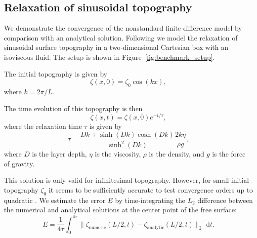 \documentclass[preprint,12pt,authoryear]{elsarticle}
\begin{document}
\subsection{Relaxation of sinusoidal topography}
\label{sec:topography_relaxation}

We demonstrate the convergence of the nonstandard finite difference model by comparison 
with an analytical solution. Following \citet{kramer2012implicit} we model the relaxation
of sinusoidal surface topography in a two-dimensional Cartesian box with an isoviscous fluid.
The setup is shown in Figure~\ref{fig:benchmark_setup}.

The initial topography is given by
\begin{equation}
\zeta(x,0) = \zeta_0 \cos\left( k x \right),
\end{equation}
where $k = 2 \pi / L$.

The time evolution of this topography is then
\begin{equation}
\zeta(x, t) = \zeta(x,0) e^{-t/\tau},
\end{equation}
where the relaxation time $\tau$ is given by
\begin{equation}
\tau = \frac{D k + \sinh(D k) \cosh(D k)}{ \sinh^2 (D k) } \frac{2 k \eta}{\rho g},
\end{equation}
where $D$ is the layer depth, $\eta$ is the viscosity, $\rho$ is the density, and $g$ is the force of gravity.

This solution is only valid for infinitesimal topography. However, for small
initial topography $\zeta_0$ it seems to be sufficiently accurate to test convergence orders up 
to quadratic \citep{kramer2012implicit, furuichi2015implicit}.
We estimate the error $E$ by time-integrating the $L_2$ difference between the numerical and analytical
solutions at the center point of the free surface:
\begin{equation}
E = \frac{1}{4\tau}\int_0^{4 \tau} \lVert \zeta_\mathrm{numeric}(L/2, t) - \zeta_\mathrm{analytic}(L/2, t) \rVert_2 \text{ d}t.
\end{equation}
\end{document}

